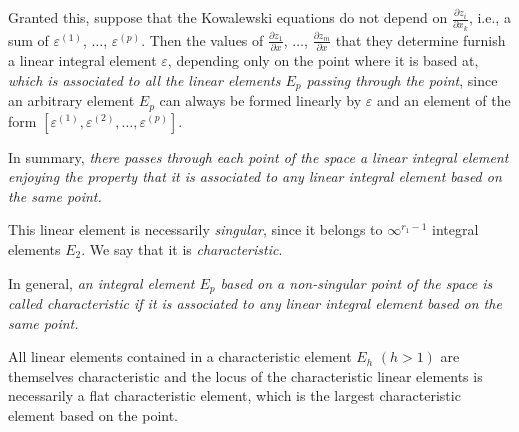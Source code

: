 \documentclass[leqno,11pt]{book}
\makeatletter
\newcommand{\pd}{\partial}
\theoremstyle{shape1}
\theoremstyle{shapesmall}
\let\old@epsilon\epsilon
\let\old@varepsilon\varepsilon
\let\epsilon\old@varepsilon
\let\varepsilon\old@epsilon
\makeatother
\begin{document}
Granted this, suppose that the Kowalewski equations do not depend on $\frac{\pd z_{i}}{\pd x_{k}}$, i.e., a sum of $\epsilon^{(1)}$, $\dots$, $\epsilon^{(p)}$. Then the values of $\frac{\pd z_{1}}{\pd x}$, $\dots$, $\frac{\pd z_{m}}{\pd x}$ that they determine furnish a linear integral element $\epsilon$, depending only on the point where it is based at, \emph{which is associated to all the linear elements $E_{p}$ passing through the point}, since an arbitrary element $E_{p}$ can always be formed linearly by $\epsilon$ and an element of the form $[\epsilon^{(1)}, \epsilon^{(2)}, \dots, \epsilon^{(p)}]$.

In summary, \emph{there passes through each point of the space a linear integral element enjoying the property that it is associated to any linear integral element based on the same point.}

This linear element is necessarily \emph{singular}, since it belongs to $\infty^{r_{1}-1}$ integral elements $E_{2}$. We say that it is \emph{characteristic}.

In general, \emph{an integral element $E_{p}$ based on a non-singular point of the space is called \emph{characteristic} if it is associated to any linear integral element based on the same point.}

All linear elements contained in a characteristic element $E_{h}$ $(h>1)$ are themselves characteristic and the locus of the characteristic linear elements is necessarily a flat characteristic element, which is the largest characteristic element based on the point.
\end{document}
